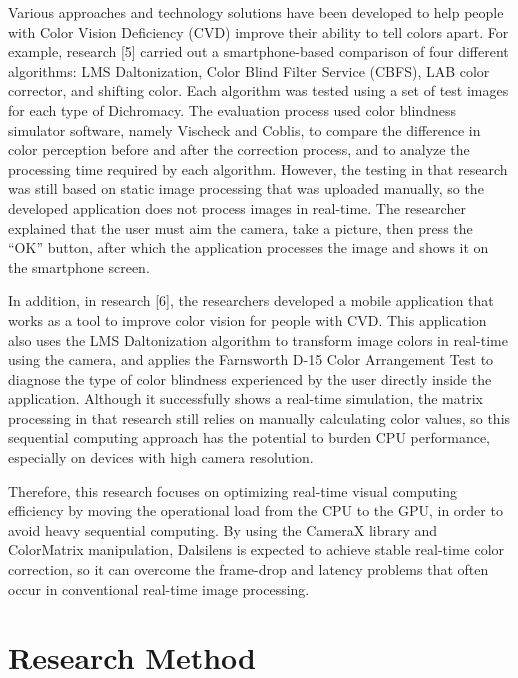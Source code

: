 Various approaches and technology solutions have been developed to help people with Color Vision Deficiency (CVD) improve their ability to tell colors apart. For example, research [5] carried out a smartphone-based comparison of four different algorithms: LMS Daltonization, Color Blind Filter Service (CBFS), LAB color corrector, and shifting color. Each algorithm was tested using a set of test images for each type of Dichromacy. The evaluation process used color blindness simulator software, namely Vischeck and Coblis, to compare the difference in color perception before and after the correction process, and to analyze the processing time required by each algorithm. However, the testing in that research was still based on static image processing that was uploaded manually, so the developed application does not process images in real-time. The researcher explained that the user must aim the camera, take a picture, then press the ``OK'' button, after which the application processes the image and shows it on the smartphone screen.

In addition, in research [6], the researchers developed a mobile application that works as a tool to improve color vision for people with CVD. This application also uses the LMS Daltonization algorithm to transform image colors in real-time using the camera, and applies the Farnsworth D-15 Color Arrangement Test to diagnose the type of color blindness experienced by the user directly inside the application. Although it successfully shows a real-time simulation, the matrix processing in that research still relies on manually calculating color values, so this sequential computing approach has the potential to burden CPU performance, especially on devices with high camera resolution.

Therefore, this research focuses on optimizing real-time visual computing efficiency by moving the operational load from the CPU to the GPU, in order to avoid heavy sequential computing. By using the CameraX library and ColorMatrix manipulation, Dalsilens is expected to achieve stable real-time color correction, so it can overcome the frame-drop and latency problems that often occur in conventional real-time image processing.

\section{Research Method}


